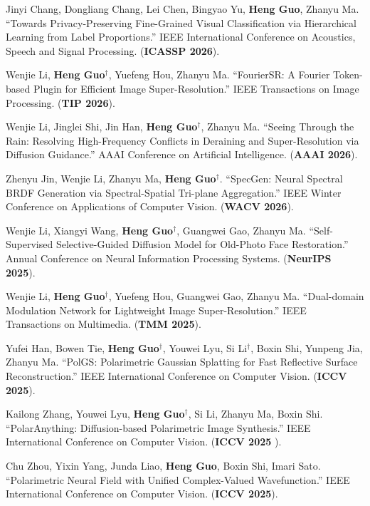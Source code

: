 \begin{enumerate}[label={[\arabic*]}]
	\item Jinyi Chang, Dongliang Chang, Lei Chen, Bingyao Yu, \textbf{Heng Guo}, Zhanyu Ma. ``Towards Privacy-Preserving Fine-Grained Visual Classification via Hierarchical Learning from Label Proportions.'' IEEE International Conference on Acoustics, Speech and Signal Processing. (\textbf{ICASSP 2026}).
	\item Wenjie Li, \textbf{Heng Guo}$^\dagger$, Yuefeng Hou, Zhanyu Ma. ``FourierSR: A Fourier Token-based Plugin for Efficient Image Super-Resolution.'' IEEE Transactions on Image Processing. (\textbf{TIP 2026}).
	\item Wenjie Li, Jinglei Shi, Jin Han, \textbf{Heng Guo}$^\dagger$, Zhanyu Ma. ``Seeing Through the Rain: Resolving High-Frequency Conflicts in Deraining and Super-Resolution via Diffusion Guidance.'' AAAI Conference on Artificial Intelligence. (\textbf{AAAI 2026}).
	\item Zhenyu Jin, Wenjie Li, Zhanyu Ma, \textbf{Heng Guo}$^\dagger$. ``SpecGen: Neural Spectral BRDF Generation via Spectral-Spatial Tri-plane Aggregation.'' IEEE Winter Conference on Applications of Computer Vision. (\textbf{WACV 2026}).
	\item Wenjie Li, Xiangyi Wang, \textbf{Heng Guo}$^\dagger$, Guangwei Gao, Zhanyu Ma. ``Self-Supervised Selective-Guided Diffusion Model for Old-Photo Face Restoration.'' Annual Conference on Neural Information Processing Systems. (\textbf{NeurIPS 2025}).
	\item Wenjie Li, \textbf{Heng Guo}$^\dagger$, Yuefeng Hou, Guangwei Gao, Zhanyu Ma. ``Dual-domain Modulation Network for Lightweight Image Super-Resolution.'' IEEE Transactions on Multimedia. (\textbf{TMM 2025}).
	\item Yufei Han, Bowen Tie, \textbf{Heng Guo}$^\dagger$, Youwei Lyu, Si Li$^\dagger$, Boxin Shi, Yunpeng Jia, Zhanyu Ma. ``PolGS: Polarimetric Gaussian Splatting for Fast Reflective Surface Reconstruction.'' IEEE International Conference on Computer Vision. (\textbf{ICCV 2025}).
	\item Kailong Zhang, Youwei Lyu, \textbf{Heng Guo}$^\dagger$, Si Li, Zhanyu Ma, Boxin Shi. ``PolarAnything: Diffusion-based Polarimetric Image Synthesis.'' IEEE International Conference on Computer Vision. (\textbf{ICCV 2025 \color{red}{Highlight}}).
	\item Chu Zhou, Yixin Yang, Junda Liao, \textbf{Heng Guo}, Boxin Shi, Imari Sato. ``Polarimetric Neural Field with Unified Complex-Valued Wavefunction.'' IEEE International Conference on Computer Vision. (\textbf{ICCV 2025}).

\end{enumerate}
